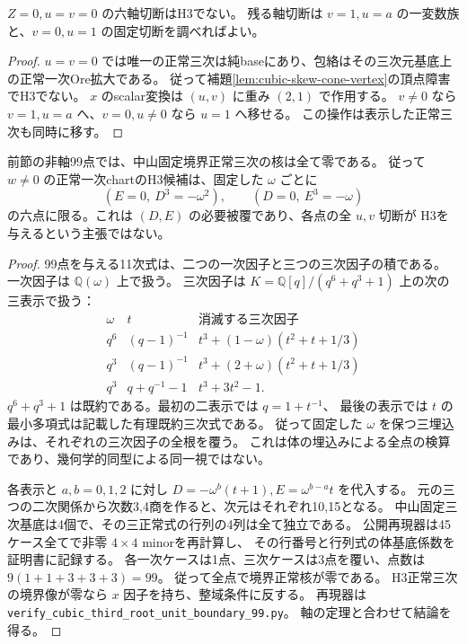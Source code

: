 \begin{corollary}[軸切断の残る最小パラメータ]
$Z=0,u=v=0$ の六軸切断はH3でない。
残る軸切断は $v=1,u=a$ の一変数族と、$v=0,u=1$ の固定切断を調べればよい。
\end{corollary}
\begin{proof}
$u=v=0$ では唯一の正常三次は純baseにあり、包絡はその三次元基底上の正常一次Ore拡大である。
従って補題\ref{lem:cubic-skew-cone-vertex}の頂点障害でH3でない。
$x$ のscalar変換は $(u,v)$ に重み $(2,1)$ で作用する。
$v\ne0$ なら $v=1,u=a$ へ、$v=0,u\ne0$ なら $u=1$ へ移せる。
この操作は表示した正常三次も同時に移す。
\end{proof}

\begin{theorem}[非軸99点の排除と六点への必要被覆]
\label{thm:cubic-third-root-unit-boundary-six-points}
前節の非軸99点では、中山固定境界正常三次の核は全て零である。
従って $w\ne0$ の正常一次chartのH3候補は、固定した $\omega$ ごとに
\[
 (E=0,\ D^3=-\omega^2),\qquad (D=0,\ E^3=-\omega)
\]
の六点に限る。これは $(D,E)$ の必要被覆であり、各点の全 $u,v$ 切断が
H3を与えるという主張ではない。
\end{theorem}
\begin{proof}
99点を与える11次式は、二つの一次因子と三つの三次因子の積である。
一次因子は $\mathbb Q(\omega)$ 上で扱う。
三次因子は $K=\mathbb Q[q]/(q^6+q^3+1)$ 上の次の三表示で扱う：
\[
\begin{array}{c|c|c}
 \omega&t&\text{消滅する三次因子}\\\hline
 q^6&(q-1)^{-1}&t^3+(1-\omega)(t^2+t+1/3)\\
 q^3&(q-1)^{-1}&t^3+(2+\omega)(t^2+t+1/3)\\
 q^3&q+q^{-1}-1&t^3+3t^2-1.
\end{array}
\]
$q^6+q^3+1$ は既約である。最初の二表示では $q=1+t^{-1}$、
最後の表示では $t$ の最小多項式は記載した有理既約三次式である。
従って固定した $\omega$ を保つ三埋込みは、それぞれの三次因子の全根を覆う。
これは体の埋込みによる全点の検算であり、幾何学的同型による同一視ではない。

各表示と $a,b=0,1,2$ に対し
$D=-\omega^b(t+1), E=\omega^{b-a}t$ を代入する。
元の三つの二次関係から次数3,4商を作ると、次元はそれぞれ10,15となる。
中山固定三次基底は4個で、その三正常式の行列の4列は全て独立である。
公開再現器は45ケース全てで非零 $4\times4$ minorを再計算し、
その行番号と行列式の体基底係数を証明書に記録する。
各一次ケースは1点、三次ケースは3点を覆い、点数は $9(1+1+3+3+3)=99$。
従って全点で境界正常核が零である。
H3正常三次の境界像が零なら $x$ 因子を持ち、整域条件に反する。
再現器は \texttt{verify\_cubic\_third\_root\_unit\_boundary\_99.py}。
軸の定理と合わせて結論を得る。
\end{proof}

